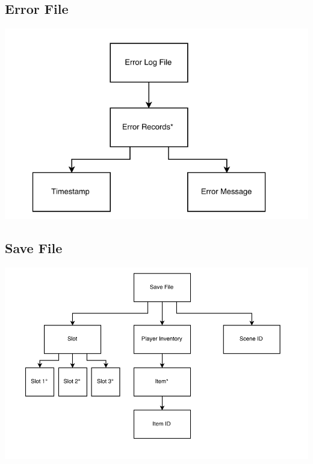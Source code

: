 \documentclass{article}
\begin{document}
	\subsection{Error File}
		\begin{center}
			\includegraphics{ErrorFile}
		\end{center}
	\subsection{Save File}
		\begin{center}
			\includegraphics{SaveFile}
		\end{center}
\end{document}
